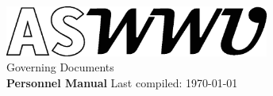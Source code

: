 \documentclass[10pt, letterpaper]{book}
\begin{document}
\nolinenumbers
\begin{titlepage}
    \begin{center}
        \vspace*{5cm}
  		\includegraphics[width=0.65\textwidth]{Formatting/Logo_ASWWU-Black}\\
        \LARGE Governing Documents\\ \Huge \textbf{Personnel Manual}
        \vfill
        \normalsize Last compiled: \today\ \currenttime
             
    \end{center}
 \end{titlepage}
\setcounter{tocdepth}{3}
\tableofcontents
\linenumbers
\newpage
\end{document}
